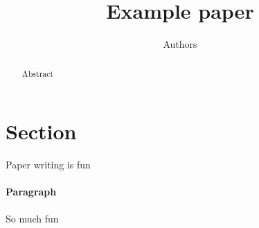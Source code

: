 \documentclass{article}
\title{Example paper}
\author{Authors}
\begin{document}
\maketitle

\begin{abstract}
    Abstract
\end{abstract}


\section{Section}
\label{sec:section}

Paper writing is fun


\paragraph{Paragraph}
%
So much fun



\end{document}
